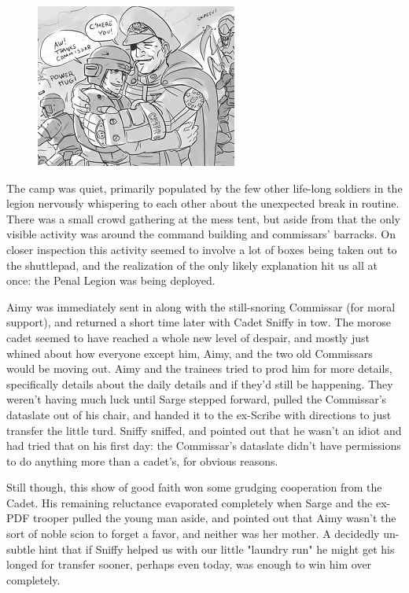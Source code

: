 \begin{figure}
	\begin{center}
		\includegraphics[width=\figwidth]{pics/21/61.png}
	\end{center}
\end{figure}
The camp was quiet, primarily populated by the few other life-long soldiers in the legion nervously whispering to each other about the unexpected break in routine. 
There was a small crowd gathering at the mess tent, but aside from that the only visible activity was around the command building and commissars' barracks. 
On closer inspection this activity seemed to involve a lot of boxes being taken out to the shuttlepad, and the realization of the only likely explanation hit us all at once: 
the Penal Legion was being deployed.

Aimy was immediately sent in along with the still-snoring Commissar (for moral support), and returned a short time later with Cadet Sniffy in tow. 
The morose cadet seemed to have reached a whole new level of despair, and mostly just whined about how everyone except him, Aimy, and the two old Commissars would be moving out. 
Aimy and the trainees tried to prod him for more details, specifically details about the daily details and if they'd still be happening. 
They weren't having much luck until Sarge stepped forward, pulled the Commissar's dataslate out of his chair, and handed it to the ex-Scribe with directions to just transfer the little turd. 
Sniffy sniffed, and pointed out that he wasn't an idiot and had tried that on his first day: 
the Commissar's dataslate didn't have permissions to do anything more than a cadet's, for obvious reasons.

Still though, this show of good faith won some grudging cooperation from the Cadet. 
His remaining reluctance evaporated completely when Sarge and the ex-PDF trooper pulled the young man aside, and pointed out that Aimy wasn't the sort of noble scion to forget a favor, and neither was her mother. 
A decidedly un-subtle hint that if Sniffy helped us with our little "laundry run" he might get his longed for transfer sooner, perhaps even today, was enough to win him over completely.


